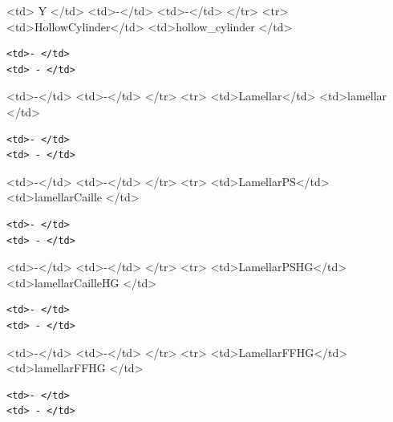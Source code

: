 \textless{}td\textgreater{} Y \textless{}/td\textgreater{} \textless{}td\textgreater{}-\textless{}/td\textgreater{} \textless{}td\textgreater{}-\textless{}/td\textgreater{} \textless{}/tr\textgreater{} \textless{}tr\textgreater{} \textless{}td\textgreater{}HollowCylinder\textless{}/td\textgreater{} \textless{}td\textgreater{}hollow\_cylinder \textless{}/td\textgreater{}

\begin{verbatim}
<td>- </td>
<td> - </td>
\end{verbatim}

\textless{}td\textgreater{}-\textless{}/td\textgreater{} \textless{}td\textgreater{}-\textless{}/td\textgreater{} \textless{}/tr\textgreater{} \textless{}tr\textgreater{} \textless{}td\textgreater{}Lamellar\textless{}/td\textgreater{} \textless{}td\textgreater{}lamellar \textless{}/td\textgreater{}

\begin{verbatim}
<td>- </td>
<td> - </td>
\end{verbatim}

\textless{}td\textgreater{}-\textless{}/td\textgreater{} \textless{}td\textgreater{}-\textless{}/td\textgreater{} \textless{}/tr\textgreater{} \textless{}tr\textgreater{} \textless{}td\textgreater{}LamellarPS\textless{}/td\textgreater{} \textless{}td\textgreater{}lamellarCaille \textless{}/td\textgreater{}

\begin{verbatim}
<td>- </td>
<td> - </td>
\end{verbatim}

\textless{}td\textgreater{}-\textless{}/td\textgreater{} \textless{}td\textgreater{}-\textless{}/td\textgreater{} \textless{}/tr\textgreater{} \textless{}tr\textgreater{} \textless{}td\textgreater{}LamellarPSHG\textless{}/td\textgreater{} \textless{}td\textgreater{}lamellarCailleHG \textless{}/td\textgreater{}

\begin{verbatim}
<td>- </td>
<td> - </td>
\end{verbatim}

\textless{}td\textgreater{}-\textless{}/td\textgreater{} \textless{}td\textgreater{}-\textless{}/td\textgreater{} \textless{}/tr\textgreater{} \textless{}tr\textgreater{} \textless{}td\textgreater{}LamellarFFHG\textless{}/td\textgreater{} \textless{}td\textgreater{}lamellarFFHG \textless{}/td\textgreater{}

\begin{verbatim}
<td>- </td>
<td> - </td>
\end{verbatim}

